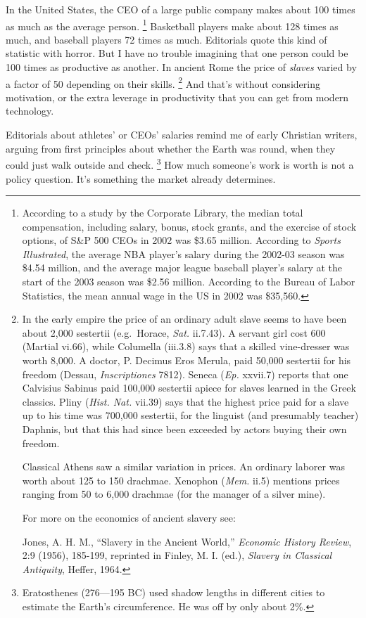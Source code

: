 In the United States, the CEO of a large public company makes about 100
times as much as the average person. \footnote{According to a study by the Corporate Library, the median total
compensation, including salary, bonus, stock grants, and the exercise of
stock options, of S\&P 500 CEOs in 2002 was \$3.65 million. According to
\emph{Sports Illustrated}, the average NBA player's salary during the
2002-03 season was \$4.54 million, and the average major league baseball
player's salary at the start of the 2003 season was \$2.56 million.
According to the Bureau of Labor Statistics, the mean annual wage in the
US in 2002 was \$35,560.} Basketball
players make about 128 times as much, and baseball players 72 times as
much. Editorials quote this kind of statistic with horror. But I have no
trouble imagining that one person could be 100 times as productive as
another. In ancient Rome the price of \emph{slaves} varied by a factor
of 50 depending on their skills. \footnote{In the early empire the price of an ordinary adult slave seems
to have been about 2,000 sestertii (e.g.~Horace, \emph{Sat.} ii.7.43). A
servant girl cost 600 (Martial vi.66), while Columella (iii.3.8) says
that a skilled vine-dresser was worth 8,000. A doctor, P. Decimus Eros
Merula, paid 50,000 sestertii for his freedom (Dessau,
\emph{Inscriptiones} 7812). Seneca (\emph{Ep.} xxvii.7) reports that one
Calvisius Sabinus paid 100,000 sestertii apiece for slaves learned in
the Greek classics. Pliny (\emph{Hist. Nat.} vii.39) says that the
highest price paid for a slave up to his time was 700,000 sestertii, for
the linguist (and presumably teacher) Daphnis, but that this had since
been exceeded by actors buying their own freedom.

Classical Athens saw a similar variation in prices. An ordinary laborer
was worth about 125 to 150 drachmae. Xenophon (\emph{Mem.} ii.5)
mentions prices ranging from 50 to 6,000 drachmae (for the manager of a
silver mine).

For more on the economics of ancient slavery see:

Jones, A. H. M., ``Slavery in the Ancient World,'' \emph{Economic
History Review}, 2:9 (1956), 185-199, reprinted in Finley, M. I. (ed.),
\emph{Slavery in Classical Antiquity}, Heffer, 1964.} And that's
without considering motivation, or the extra leverage in productivity
that you can get from modern technology.

Editorials about athletes' or CEOs' salaries remind me of early
Christian writers, arguing from first principles about whether the Earth
was round, when they could just walk outside and check.
\footnote{Eratosthenes (276---195 BC) used shadow lengths in different
cities to estimate the Earth's circumference. He was off by only about
2\%.} How much someone's work is worth is not a policy
question. It's something the market already determines.

